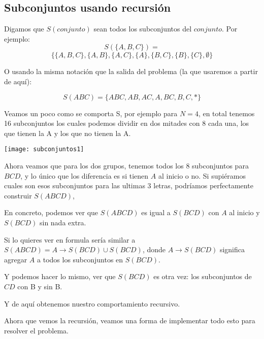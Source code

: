 \subsection* {Subconjuntos usando recursión}

Digamos que \(S(conjunto)\) sean todos los subconjuntos del \(conjunto\). Por ejemplo:
\[S(\{A,B,C\})=\]
\[\{\{A,B,C\},\{A,B\},	\{A,C\},\{A\},\{B,C\},	\{B\},\{C\},	\emptyset\} \]

O usando la misma notación que la salida del problema (la que usaremos a partir de aquí):

\[S(ABC)=\{ABC, AB, AC, A, BC, B, C, * \}\]

Veamos un poco como se comporta S, por ejemplo para \(N = 4\), en total tenemos 16 subconjuntos los cuales podemos dividir en dos mitades con 8 cada una, los que tienen la A y los que no tienen la A.



\begin{center}
	\texttt{[image: subconjuntos1]}
\end{center}

Ahora veamos que para los dos grupos, tenemos todos los 8 subconjuntos para \(BCD\), y lo único que los diferencia es si tienen \(A\) al inicio o no. Si supiéramos cuales son esos subconjuntos para las ultimas 3 letras, podríamos perfectamente construir \(S(ABCD)\), 

En concreto, podemos ver que \(S(ABCD) \) es igual a \(S(BCD)\) con \(A\) al inicio y \(S(BCD)\) sin nada extra. 

Si lo quieres ver en formula sería similar a \(S(ABCD)=A\rightarrow S(BCD) \cup S(BCD)\), donde \(A\rightarrow S(BCD)\) significa agregar \(A\) a todos los subconjuntos en \(S(BCD)\).

Y podemos hacer lo mismo, ver que \(S(BCD)\) es otra vez: los subconjuntos de \(CD\) con B y sin B.

Y de aquí obtenemos nuestro comportamiento recursivo.

Ahora que vemos la recursión, veamos una forma de implementar todo esto para resolver el problema.

